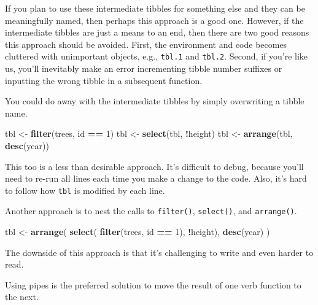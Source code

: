 \documentclass[
  11pt,
]{krantz}
\newenvironment{Shaded}{\begin{snugshade}}{\end{snugshade}}
\newcommand{\DecValTok}[1]{\textcolor[rgb]{0.00,0.00,0.81}{#1}}
\newcommand{\KeywordTok}[1]{\textcolor[rgb]{0.13,0.29,0.53}{\textbf{#1}}}
\newcommand{\NormalTok}[1]{#1}
\newcommand{\OperatorTok}[1]{\textcolor[rgb]{0.81,0.36,0.00}{\textbf{#1}}}
\newcommand{\StringTok}[1]{\textcolor[rgb]{0.31,0.60,0.02}{#1}}
\theoremstyle{definition}
\theoremstyle{definition}
\theoremstyle{definition}
\theoremstyle{definition}
\theoremstyle{remark}
\begin{document}
If you plan to use these intermediate tibbles for something else and they can be meaningfully named, then perhaps this approach is a good one. However, if the intermediate tibbles are just a means to an end, then there are two good reasons this approach should be avoided. First, the environment and code becomes cluttered with unimportant objects, e.g., \texttt{tbl.1} and \texttt{tbl.2}. Second, if you're like us, you'll inevitably make an error incrementing tibble number suffixes or inputting the wrong tibble in a subsequent function.

You could do away with the intermediate tibbles by simply overwriting a tibble name.

\begin{Shaded}
\begin{Highlighting}[]
\NormalTok{tbl \textless{}{-}}\StringTok{ }\KeywordTok{filter}\NormalTok{(trees, id }\OperatorTok{==}\StringTok{ }\DecValTok{1}\NormalTok{)}
\NormalTok{tbl \textless{}{-}}\StringTok{ }\KeywordTok{select}\NormalTok{(tbl, }\OperatorTok{!}\NormalTok{height)}
\NormalTok{tbl \textless{}{-}}\StringTok{ }\KeywordTok{arrange}\NormalTok{(tbl, }\KeywordTok{desc}\NormalTok{(year))}
\end{Highlighting}
\end{Shaded}

This too is a less than desirable approach. It's difficult to debug, because you'll need to re-run all lines each time you make a change to the code. Also, it's hard to follow how \texttt{tbl} is modified by each line.

Another approach is to nest the calls to \texttt{filter()}, \texttt{select()}, and \texttt{arrange()}.

\begin{Shaded}
\begin{Highlighting}[]
\NormalTok{tbl \textless{}{-}}\StringTok{ }\KeywordTok{arrange}\NormalTok{(}
          \KeywordTok{select}\NormalTok{(}
              \KeywordTok{filter}\NormalTok{(trees, id }\OperatorTok{==}\StringTok{ }\DecValTok{1}\NormalTok{), }
            \OperatorTok{!}\NormalTok{height), }
          \KeywordTok{desc}\NormalTok{(year)}
\NormalTok{        )}
\end{Highlighting}
\end{Shaded}

The downside of this approach is that it's challenging to write and even harder to read.

Using pipes is the preferred solution to move the result of one verb function to the next.
\end{document}
